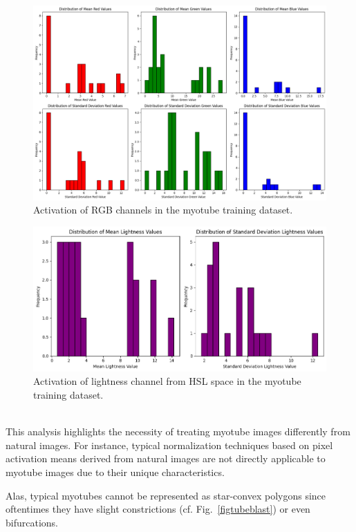 \begin{figure}
	\centering
	\includegraphics[width=\textwidth]{"images/pixel_distribution_plots_rgb.png"}
	\caption[Myotube RGB activation distribution]{Activation of RGB channels in the myotube training dataset.}
	\label{figrgb}
\end{figure}
\begin{figure}
	\centering
	\includegraphics[width=\textwidth]{"images/pixel_distribution_plots_hsl.png"}
	\caption[Myotube lightness activation distribution]{Activation of lightness channel from HSL space in the myotube training dataset.}
	\label{fighsl}
\end{figure}
\ \\
This analysis highlights the necessity of treating myotube images differently from natural images. For instance, typical normalization techniques based on pixel activation means derived from natural images are not directly applicable to myotube images due to their unique characteristics.

Alas, typical myotubes cannot be represented as star-convex polygons since oftentimes they have slight constrictions (cf. Fig.~\ref{figtubeblast}) or even bifurcations.


